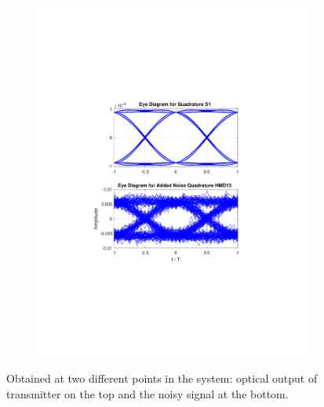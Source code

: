 \begin{figure}[H]
\begin{minipage}{\linewidth}
\begin{subfigure}{.45\textwidth}
		\includegraphics[clip, trim=5cm 7cm 5cm 7cm, width=\textwidth]{./sdf/m_qam_system/figures/eyes/q_n_nmf_45_60_rc_09.pdf}
	\end{subfigure}
	
	\caption{
		Obtained
		at two different points in the system: optical output of transmitter on the top and
		the noisy signal at the bottom.
		\label{fig:eyes_n_rc_45_09}}
	\end{minipage}
\end{figure}
